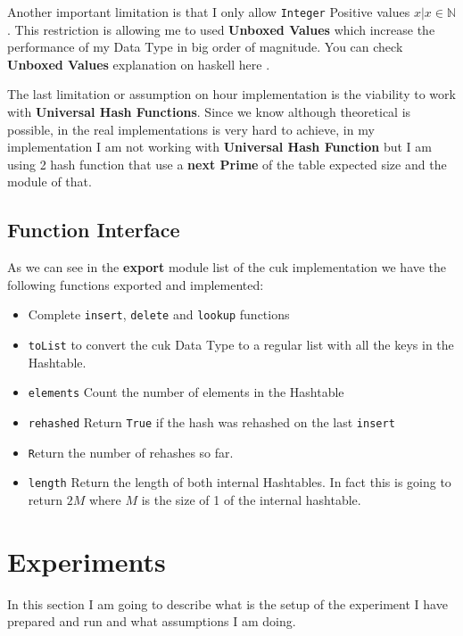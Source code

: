 \documentclass[12pt, a4paper]{article}
\begin{document}
Another important limitation is that I only allow \texttt{Integer} Positive values $x | x \in \mathbb{N}$. This restriction is allowing me to used \textbf{Unboxed Values} which increase the performance of my Data Type in big order of magnitude. You can check \textbf{Unboxed Values} explanation on \acrshort{haskell} here \cite{unboxed}.

The last limitation or assumption on hour implementation is the viability to work with \textbf{Universal Hash Functions}. Since we know although theoretical is possible, in the real implementations is very hard to achieve, in my implementation I am not working with \textbf{Universal Hash Function} but I am using 2 hash function that use a \textbf{next Prime} of the table expected size and the module of that.

\subsection{Function Interface}
As we can see in the \textbf{export} module list of the \acrshort{cuk} implementation we have the following functions exported and implemented:

\begin{itemize}
  \item Complete \texttt{insert}, \texttt{delete} and \texttt{lookup} functions
  \item \texttt{toList} to convert the \acrshort{cuk} Data Type to a regular list with all the keys in the Hashtable.
  \item \texttt{elements} Count the number of elements in the Hashtable
  \item \texttt{rehashed} Return \texttt{True} if the hash was rehashed on the last \texttt{insert}
  \item \texttt Return the number of rehashes so far.
  \item \texttt{length} Return the length of both internal Hashtables. In fact this is going to return $2M$ where $M$ is the size of 1 of the internal hashtable.
\end{itemize}

\section{Experiments}
In this section I am going to describe what is the setup of the experiment I have prepared and run and what assumptions I am doing.
\end{document}
